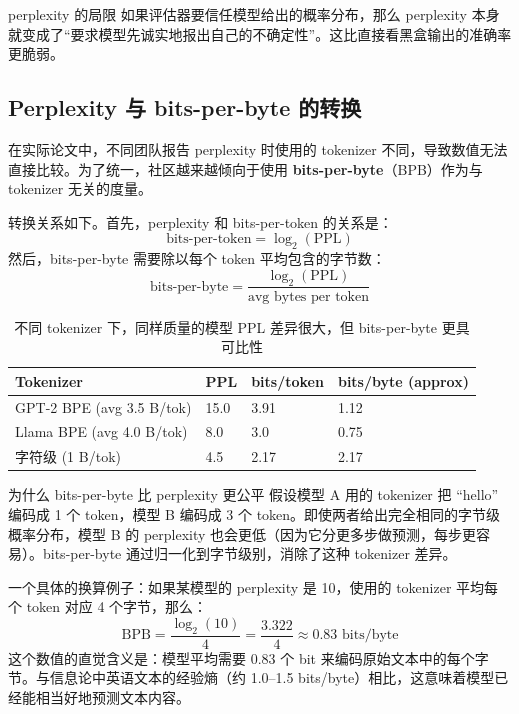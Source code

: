 \documentclass[a4paper]{article}
\begin{document}
\begin{knowledgebox}{perplexity 的局限}
如果评估器要信任模型给出的概率分布，那么 perplexity 本身就变成了``要求模型先诚实地报出自己的不确定性''。这比直接看黑盒输出的准确率更脆弱。
\end{knowledgebox}

\subsection{Perplexity 与 bits-per-byte 的转换}

在实际论文中，不同团队报告 perplexity 时使用的 tokenizer 不同，导致数值无法直接比较。为了统一，社区越来越倾向于使用 \textbf{bits-per-byte}（BPB）作为与 tokenizer 无关的度量。

转换关系如下。首先，perplexity 和 bits-per-token 的关系是：
\[
\text{bits-per-token} = \log_2(\mathrm{PPL})
\]
然后，bits-per-byte 需要除以每个 token 平均包含的字节数：
\[
\text{bits-per-byte} = \frac{\log_2(\mathrm{PPL})}{\text{avg bytes per token}}
\]

\begin{table}[H]
\centering
\begin{tabular}{p{3.5cm}p{3.0cm}p{3.0cm}p{3.5cm}}
\toprule
\textbf{Tokenizer} & \textbf{PPL} & \textbf{bits/token} & \textbf{bits/byte (approx)} \\
\midrule
GPT-2 BPE (avg 3.5 B/tok) & 15.0 & 3.91 & 1.12 \\
Llama BPE (avg 4.0 B/tok) & 8.0 & 3.0 & 0.75 \\
字符级 (1 B/tok) & 4.5 & 2.17 & 2.17 \\
\bottomrule
\end{tabular}
\caption{不同 tokenizer 下，同样质量的模型 PPL 差异很大，但 bits-per-byte 更具可比性}
\end{table}

\begin{importantbox}{为什么 bits-per-byte 比 perplexity 更公平}
假设模型 A 用的 tokenizer 把 ``hello'' 编码成 1 个 token，模型 B 编码成 3 个 token。即使两者给出完全相同的字节级概率分布，模型 B 的 perplexity 也会更低（因为它分更多步做预测，每步更容易）。bits-per-byte 通过归一化到字节级别，消除了这种 tokenizer 差异。
\end{importantbox}

一个具体的换算例子：如果某模型的 perplexity 是 10，使用的 tokenizer 平均每个 token 对应 4 个字节，那么：
\[
\text{BPB} = \frac{\log_2(10)}{4} = \frac{3.322}{4} \approx 0.83 \text{ bits/byte}
\]
这个数值的直觉含义是：模型平均需要 0.83 个 bit 来编码原始文本中的每个字节。与信息论中英语文本的经验熵（约 1.0--1.5 bits/byte）相比，这意味着模型已经能相当好地预测文本内容。
\end{document}
